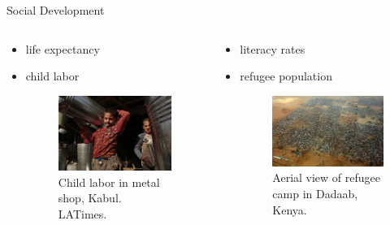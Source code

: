 \documentclass{beamer}
\begin{document}
\begin{frame}{Social Development}
\begin{columns}
  \begin{column}{0.5\textwidth}
    \begin{itemize}
        \item life expectancy
        \item child labor
        \begin{figure}
	\centering
	\includegraphics[scale=0.55]{images/child_labor.jpeg}
	\caption{Child labor in metal shop, Kabul. LATimes.}
	\end{figure}
    \end{itemize}
  \end{column}

  \begin{column}{0.5\textwidth}
     \begin{itemize}
        \item literacy rates
        \item refugee population
        \begin{figure}
	\centering
	\includegraphics[scale=0.2]{images/refugee_camp.jpg}
	\caption{Aerial view of refugee camp in Dadaab, Kenya.}
	\end{figure}
     \end{itemize}
  \end{column}
\end{columns}
\end{frame}
\end{document}
